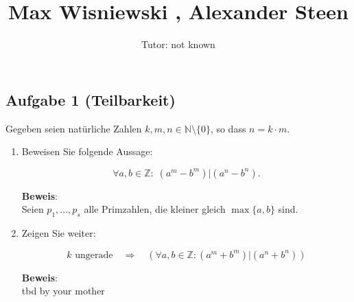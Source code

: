\documentclass[11pt,a4paper,ngerman]{article}
\author{Tutor: not known}
\date{}
\title{Max Wisniewski , Alexander Steen}
\newcommand{\NN}{\mathbb{N} \setminus \{0\}}
\newcommand{\Z}{\mathbb{Z}}
\begin{document}

\maketitle
\thispagestyle{fancy}


\subsection*{Aufgabe 1 (Teilbarkeit)}

Gegeben seien natürliche Zahlen $k, m, n \in \NN $, so dass $ n = k \cdot m $.

\begin{enumerate}[\bfseries a)]

\item Beweisen Sie folgende Aussage:

$$\forall a,b \in \Z : \; (a^m - b^m) | (a^n - b^n).$$



\textbf{Beweis}: \\
Seien $p_1, ... , p_s$ alle Primzahlen, die kleiner gleich $\max\{a,b\}$ sind.

\item Zeigen Sie weiter:

$$ k \text{ ungerade} \quad \Rightarrow \quad (\forall a,b \in \Z : (a^m + b^m) | (a^n + b^n))$$


\textbf{Beweis}: \\

tbd by your mother

\end{enumerate}



\end{document}
